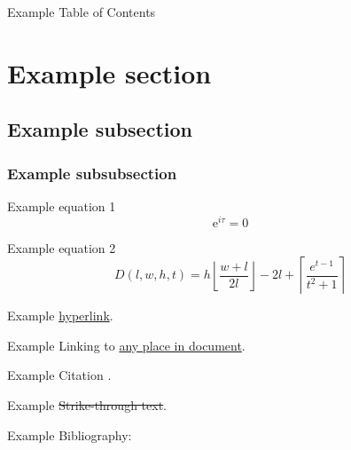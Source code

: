 \documentclass[11pt]{article}
\begin{document}
Example Table of Contents

\tableofcontents

\section{Example section}
\subsection{Example subsection}
\subsubsection{Example subsubsection}

Example equation 1
\begin{equation}
    \mathrm{e}^{i\tau} = 0
\end{equation}

Example equation 2
\begin{equation}
    D(l,w,h,t) = h \left\lfloor \frac{w+l}{2l} \right\rfloor - 2l + \left\lceil \frac{e^{t-1}}{t^2+1} \right\rceil
\end{equation}

Example \href{https://www.ntnu.edu}{hyperlink}.

Example Linking to \hyperlink{anyplace}{any place in document}.

Example Citation \cite{example1988}.

Example \sout{Strike-through text}.

Example Bibliography:

\printbibliography
\end{document}
